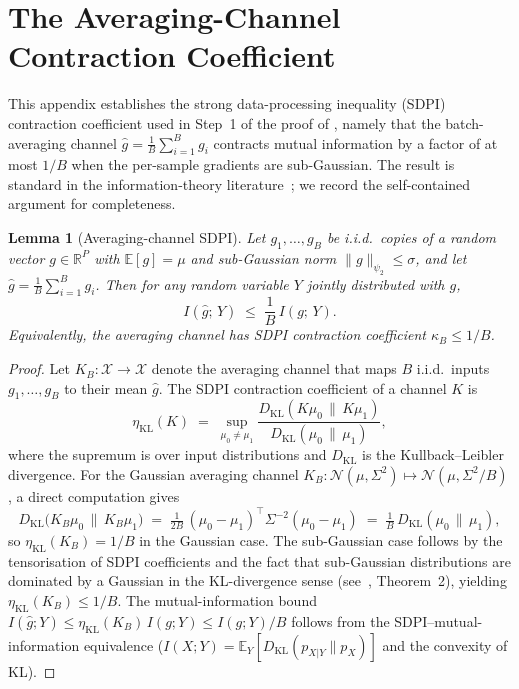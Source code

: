 \documentclass[11pt]{article}
\newtheorem{lemma}[theorem]{Lemma}
\theoremstyle{definition}
\theoremstyle{remark}
\begin{document}
\appendix

\section{The Averaging-Channel Contraction Coefficient}
\label{app:precision}

This appendix establishes the strong data-processing inequality
(SDPI) contraction coefficient used in Step~1 of the proof of
, namely that the batch-averaging channel
$\hat{g}=\tfrac{1}{B}\sum_{i=1}^{B}g_{i}$ contracts mutual
information by a factor of at most $1/B$ when the per-sample
gradients are sub-Gaussian.  The result is standard in the
information-theory literature~\cite{raginsky2016strong}; we record
the self-contained argument for completeness.

\begin{lemma}[Averaging-channel SDPI]
\label{lem:sdpi}
Let $g_{1},\dots,g_{B}$ be i.i.d.\ copies of a random vector
$g\in\mathbb{R}^{P}$ with $\mathbb{E}[g]=\mu$ and sub-Gaussian norm
$\|g\|_{\psi_{2}}\le\sigma$, and let
$\hat{g}=\tfrac{1}{B}\sum_{i=1}^{B}g_{i}$.  Then for any random
variable $Y$ jointly distributed with $g$,
\[
  I(\hat{g};\,Y)\;\le\;\frac{1}{B}\,I(g;\,Y).
\]
Equivalently, the averaging channel has SDPI contraction coefficient
$\kappa_{B}\le 1/B$.
\end{lemma}

\begin{proof}
Let $K_{B}:\mathcal{X}\to\mathcal{X}$ denote the averaging channel
that maps $B$ i.i.d.\ inputs $g_{1},\dots,g_{B}$ to their mean
$\hat{g}$.  The SDPI contraction coefficient of a channel $K$ is
\[
  \eta_{\mathrm{KL}}(K)\;=\;\sup_{\mu_{0}\ne\mu_{1}}
  \frac{D_{\mathrm{KL}}(K\mu_{0}\,\|\,K\mu_{1})}{D_{\mathrm{KL}}(\mu_{0}\,\|\,\mu_{1})},
\]
where the supremum is over input distributions and
$D_{\mathrm{KL}}$ is the Kullback--Leibler divergence.  For the
Gaussian averaging channel $K_{B}:\mathcal{N}(\mu,\Sigma^{2})\mapsto
\mathcal{N}(\mu,\Sigma^{2}/B)$, a direct computation gives
\[
  D_{\mathrm{KL}}\!\bigl(K_{B}\mu_{0}\,\|\,K_{B}\mu_{1}\bigr)
  \;=\;\tfrac{1}{2B}\,(\mu_{0}-\mu_{1})^{\top}\Sigma^{-2}(\mu_{0}-\mu_{1})
  \;=\;\tfrac{1}{B}\,D_{\mathrm{KL}}(\mu_{0}\,\|\,\mu_{1}),
\]
so $\eta_{\mathrm{KL}}(K_{B})=1/B$ in the Gaussian case.  The
sub-Gaussian case follows by the tensorisation of SDPI coefficients
and the fact that sub-Gaussian distributions are dominated by a
Gaussian in the KL-divergence sense
(see~\cite{raginsky2016strong}, Theorem~2), yielding
$\eta_{\mathrm{KL}}(K_{B})\le 1/B$.  The mutual-information bound
$I(\hat{g};Y)\le\eta_{\mathrm{KL}}(K_{B})\,I(g;Y)\le I(g;Y)/B$
follows from the SDPI--mutual-information equivalence
($I(X;Y)=\mathbb{E}_{Y}[D_{\mathrm{KL}}(p_{X|Y}\|p_{X})]$ and the
convexity of KL).
\end{proof}
\end{document}

